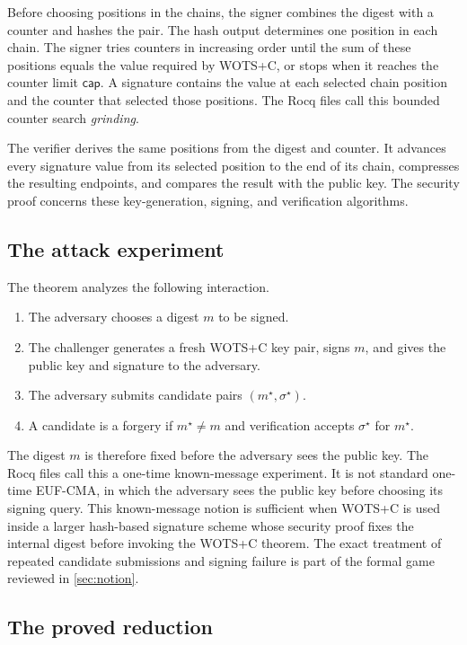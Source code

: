 \documentclass[11pt,a4paper]{article}
\theoremstyle{plain}
\theoremstyle{definition}
\newcommand{\WOTSC}{\textsf{WOTS+C}\xspace}
\begin{document}
Before choosing positions in the chains, the signer combines the digest with a counter and hashes the pair.
The hash output determines one position in each chain.
The signer tries counters in increasing order until the sum of these positions equals the value required by \WOTSC, or stops when it reaches the counter limit \(\mathsf{cap}\).
A signature contains the value at each selected chain position and the counter that selected those positions.
The Rocq files call this bounded counter search \emph{grinding}.

The verifier derives the same positions from the digest and counter.
It advances every signature value from its selected position to the end of its chain, compresses the resulting endpoints, and compares the result with the public key.
The security proof concerns these key-generation, signing, and verification algorithms.

\subsection{The attack experiment}

The theorem analyzes the following interaction.

\begin{enumerate}[leftmargin=1.6em,itemsep=2pt]
\item The adversary chooses a digest \(m\) to be signed.
\item The challenger generates a fresh \WOTSC key pair, signs \(m\), and gives the public key and signature to the adversary.
\item The adversary submits candidate pairs \((m^\star,\sigma^\star)\).
\item A candidate is a forgery if \(m^\star\neq m\) and verification accepts \(\sigma^\star\) for \(m^\star\).
\end{enumerate}

The digest \(m\) is therefore fixed before the adversary sees the public key.
The Rocq files call this a one-time known-message experiment.
It is not standard one-time EUF-CMA, in which the adversary sees the public key before choosing its signing query.
This known-message notion is sufficient when \WOTSC is used inside a larger hash-based signature scheme whose security proof fixes the internal digest before invoking the \WOTSC theorem.
The exact treatment of repeated candidate submissions and signing failure is part of the formal game reviewed in \cref{sec:notion}.

\subsection{The proved reduction}
\end{document}
